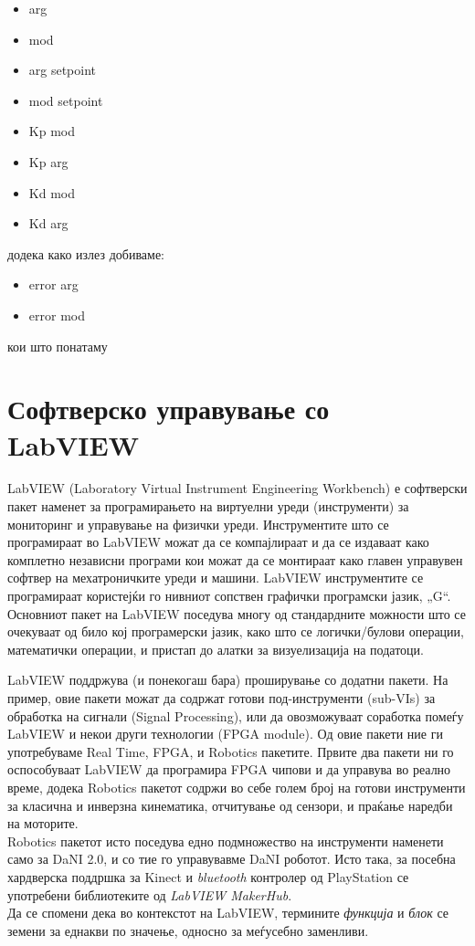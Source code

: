\documentclass[12pt]{article}
\begin{document}
      \begin{itemize}
        \item arg
        \item mod
        \item arg setpoint
        \item mod setpoint
        \item Kp mod
        \item Kp arg
        \item Kd mod
        \item Kd arg
        \end{itemize}

      додека како излез добиваме:
      \begin{itemize}
        \item error arg
        \item error mod
        \end{itemize}
        кои што понатаму


\newpage

\section{Софтверско управување со LabVIEW}
  LabVIEW (Laboratory Virtual Instrument Engineering Workbench) е софтверски пакет наменет за програмирањето на виртуелни уреди (инструменти) за мониторинг и управување на физички уреди. Инструментите што се програмираат во LabVIEW можат да се компајлираат и да се издаваат како комплетно независни програми кои можат да се монтираат како главен управувен софтвер на мехатроничките уреди и машини. LabVIEW инструментите се програмираат користејќи го нивниот сопствен графички програмски јазик, „G“.
  \\
  Основниот пакет на LabVIEW поседува многу од стандардните можности што се очекуваат од било кој програмерски јазик, како што се логички/булови операции, математички операции, и пристап до алатки за визуелизација на податоци.

  LabVIEW поддржува (и понекогаш бара) проширување со додатни пакети. На пример, овие пакети можат да содржат готови под-инструменти (sub-VIs) за обработка на сигнали (Signal Processing), или да овозможуваат соработка помеѓу LabVIEW и некои други технологии (FPGA module). Од овие пакети ние ги употребуваме Real Time, FPGA, и Robotics пакетите. Првите два пакети ни го оспособуваат LabVIEW да програмира FPGA чипови и да управува во реално време, додека Robotics пакетот содржи во себе голем број на готови инструменти за класична и инверзна кинематика, отчитување од сензори, и праќање наредби на моторите.
  \\
  Robotics пакетот исто поседува едно подмножество на инструменти наменети само за DaNI 2.0, и со тие го управувавме DaNI роботот. Исто така, за посебна хардверска поддршка за Kinect и \textit{bluetooth} контролер од PlayStation се употребени библиотеките од \textit{LabVIEW MakerHub}.
  \\
  Да се спомени дека во контекстот на LabVIEW, термините \textit{функција} и \textit{блок} се земени за еднакви по значење, односно за меѓусебно заменливи.
\end{document}
